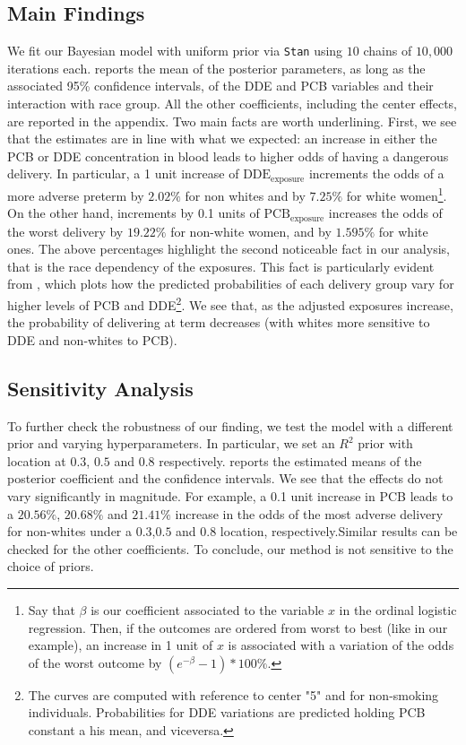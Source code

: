 \documentclass[10pt]{jmlr}%
\begin{document}
\subsection{Main Findings}
We fit our Bayesian model with uniform prior via {\tt Stan} using $10$ chains of $10,000$ iterations each.  reports the mean of the posterior parameters, as long as the associated 95\% confidence intervals, of the DDE and PCB variables and their interaction with race group. All the other coefficients, including the center effects, are reported in the appendix. Two main facts are worth underlining. First, we see that the estimates are in line with what we expected: an increase in either the  PCB or DDE concentration in blood leads to higher odds of having a dangerous delivery. In particular, a 1 unit increase of $\text{DDE}_{\text{exposure}}$ increments the odds of a more adverse preterm by $2.02\%$ for non whites and by $7.25\%$ for white women\footnote{Say that $\beta$ is our coefficient associated to the variable $x$ in the ordinal logistic regression. Then, if the outcomes are ordered from worst to best (like in our example), an increase in 1 unit of $x$ is associated with a variation of the odds of the worst outcome by $(e^{-\beta}-1)*100\%$. }. On the other hand, increments by 0.1 units of $\text{PCB}_{\text{exposure}}$ increases the odds of the worst delivery by $19.22\%$ for non-white women, and by $1.595\%$ for white ones. The above percentages highlight the second noticeable fact in our analysis, that is the race dependency of the exposures. This fact is particularly evident from , which plots how the predicted probabilities of each delivery group vary for higher levels of PCB and DDE\footnote{The curves are computed with reference to center "5" and for non-smoking individuals. Probabilities for DDE variations are predicted holding PCB constant a his mean, and viceversa.}. We see that, as the adjusted exposures increase, the probability of delivering at term decreases (with whites more sensitive to DDE and non-whites to PCB).

\subsection{Sensitivity Analysis}
To further check the robustness of our finding, we test the model with a different prior and varying hyperparameters. In particular, we set an $R^2$ prior with location at $0.3$, $0.5$ and $0.8$ respectively.  reports the estimated means of the posterior coefficient and the confidence intervals. We see that the effects do not vary significantly in magnitude. For example, a 0.1 unit increase in PCB leads to a $20.56\%$, $20.68\%$ and $21.41\%$  increase in the odds of the most adverse delivery for non-whites under a $0.3$,$0.5$ and $0.8$ location, respectively.Similar results can be checked for the other coefficients. To conclude, our method is not sensitive to the choice of priors.
\end{document}

